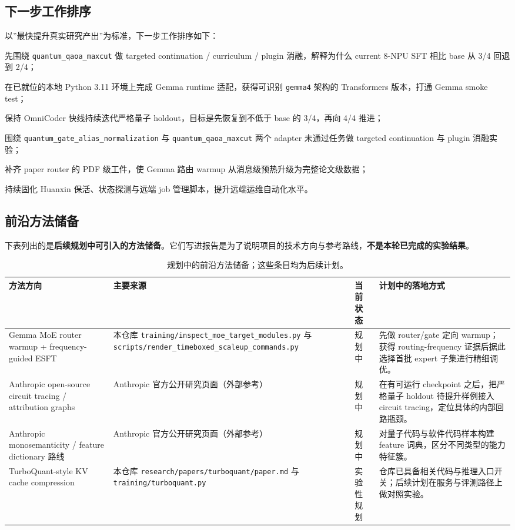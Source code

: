 \documentclass[11pt,a4paper]{article}
\newcommand{\code}[1]{\begingroup\ttfamily\footnotesize\nolinkurl{#1}\endgroup}
\begin{document}
\subsection{下一步工作排序}

以”最快提升真实研究产出”为标准，下一步工作排序如下：

  \par 先围绕 \code{quantum\_qaoa\_maxcut} 做 targeted continuation / curriculum / plugin 消融，解释为什么 current 8-NPU SFT 相比 base 从 3/4 回退到 2/4；
  \par 在已就位的本地 Python 3.11 环境上完成 Gemma runtime 适配，获得可识别 \code{gemma4} 架构的 Transformers 版本，打通 Gemma smoke test；
  \par 保持 OmniCoder 快线持续迭代严格量子 holdout，目标是先恢复到不低于 base 的 3/4，再向 4/4 推进；
  \par 围绕 \code{quantum\_gate\_alias\_normalization} 与 \code{quantum\_qaoa\_maxcut} 两个 adapter 未通过任务做 targeted continuation 与 plugin 消融实验；
  \par 补齐 paper router 的 PDF 级工件，使 Gemma 路由 warmup 从消息级预热升级为完整论文级数据；
  \par 持续固化 Huanxin 保活、状态探测与远端 job 管理脚本，提升远端运维自动化水平。


\subsection{前沿方法储备}

下表列出的是\textbf{后续规划中可引入的方法储备}。它们写进报告是为了说明项目的技术方向与参考路线，\textbf{不是本轮已完成的实验结果}。

\begin{table}[htbp]
\centering
\footnotesize
\begin{tabularx}{\textwidth}{p{2.8cm} p{2.7cm} p{2.0cm} Y}
\toprule
方法方向 & 主要来源 & 当前状态 & 计划中的落地方式 \\
\midrule
Gemma MoE router warmup + frequency-guided ESFT & 本仓库 \code{training/inspect\_moe\_target\_modules.py} 与 \code{scripts/render\_timeboxed\_scaleup\_commands.py} & 规划中 & 先做 router/gate 定向 warmup；获得 routing-frequency 证据后据此选择首批 expert 子集进行精细调优。 \\
Anthropic open-source circuit tracing / attribution graphs & Anthropic 官方公开研究页面（外部参考） & 规划中 & 在有可运行 checkpoint 之后，把严格量子 holdout 待提升样例接入 circuit tracing，定位具体的内部回路瓶颈。 \\
Anthropic monosemanticity / feature dictionary 路线 & Anthropic 官方公开研究页面（外部参考） & 规划中 & 对量子代码与软件代码样本构建 feature 词典，区分不同类型的能力特征簇。 \\
TurboQuant-style KV cache compression & 本仓库 \code{research/papers/turboquant/paper.md} 与 \code{training/turboquant.py} & 实验性规划 & 仓库已具备相关代码与推理入口开关；后续计划在服务与评测路径上做对照实验。 \\
\bottomrule
\end{tabularx}
\caption{规划中的前沿方法储备；这些条目均为后续计划。}
\label{tab:frontier-plan}
\end{table}
\end{document}
